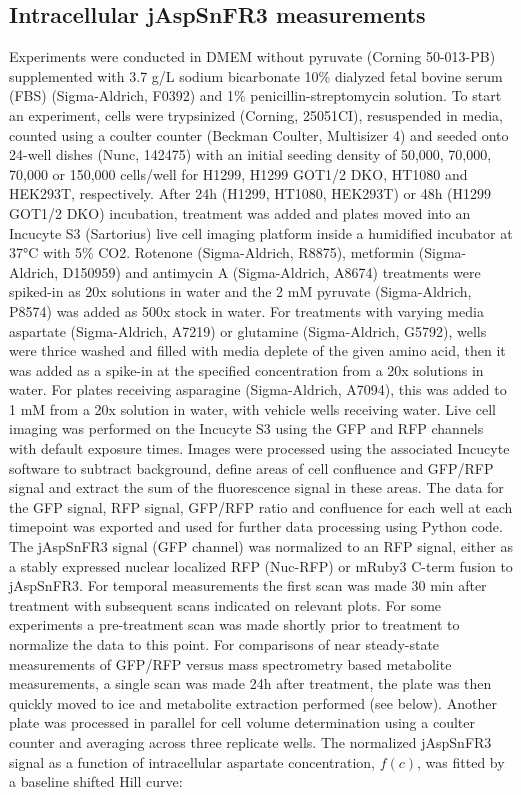 \documentclass[9pt,lineno]{elife}
\begin{document}
\subsection{Intracellular jAspSnFR3 measurements}
Experiments were conducted in DMEM without pyruvate (Corning 50-013-PB) supplemented with 3.7 g/L sodium bicarbonate 10\% dialyzed fetal bovine serum (FBS) (Sigma-Aldrich, F0392) and 1\% penicillin-streptomycin solution.
To start an experiment, cells were trypsinized (Corning, 25051CI), resuspended in media, counted using a coulter counter (Beckman Coulter, Multisizer 4) and seeded onto 24-well dishes (Nunc, 142475) with an initial seeding density of 50,000, 70,000, 70,000 or 150,000 cells/well for H1299, H1299 GOT1/2 DKO, HT1080 and HEK293T, respectively.
After 24h (H1299, HT1080, HEK293T) or 48h (H1299 GOT1/2 DKO) incubation, treatment was added and plates moved into an Incucyte S3 (Sartorius) live cell imaging platform inside a humidified incubator at 37°C with 5\% CO2.
Rotenone (Sigma-Aldrich, R8875), metformin (Sigma-Aldrich, D150959) and antimycin A (Sigma-Aldrich, A8674) treatments were spiked-in as 20x solutions in water and the 2 mM pyruvate (Sigma-Aldrich, P8574) was added as 500x stock in water.
For treatments with varying media aspartate (Sigma-Aldrich, A7219) or glutamine (Sigma-Aldrich, G5792), wells were thrice washed and filled with media deplete of the given amino acid, then it was added as a spike-in at the specified concentration from a 20x solutions in water.
For plates receiving asparagine (Sigma-Aldrich, A7094), this was added to 1 mM from a 20x solution in water, with vehicle wells receiving water.
Live cell imaging was performed on the Incucyte S3 using the GFP and RFP channels with default exposure times.
Images were processed using the associated Incucyte software to subtract background, define areas of cell confluence and GFP/RFP signal and extract the sum of the fluorescence signal in these areas.
The data for the GFP signal, RFP signal, GFP/RFP ratio and confluence for each well at each timepoint was exported and used for further data processing using Python code.
The jAspSnFR3 signal (GFP channel) was normalized to an RFP signal, either as a stably expressed nuclear localized RFP (Nuc-RFP) or mRuby3 C-term fusion to jAspSnFR3.
For temporal measurements the first scan was made 30 min after treatment with subsequent scans indicated on relevant plots.
For some experiments a pre-treatment scan was made shortly prior to treatment to normalize the data to this point.
For comparisons of near steady-state measurements of GFP/RFP versus mass spectrometry based metabolite measurements, a single scan was made 24h after treatment, the plate was then quickly moved to ice and metabolite extraction performed (see below).
Another plate was processed in parallel for cell volume determination using a coulter counter and averaging across three replicate wells.
The normalized jAspSnFR3 signal as a function of intracellular aspartate concentration, $f(c)$, was fitted by a baseline shifted Hill curve:
\end{document}
